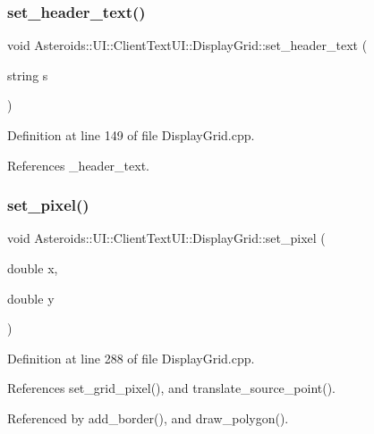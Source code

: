 \subsubsection{\texorpdfstring{set\+\_\+header\+\_\+text()}{set\_header\_text()}}
{\footnotesize\ttfamily void Asteroids\+::\+U\+I\+::\+Client\+Text\+U\+I\+::\+Display\+Grid\+::set\+\_\+header\+\_\+text (\begin{DoxyParamCaption}\item[{string}]{s }\end{DoxyParamCaption})}



Definition at line 149 of file Display\+Grid.\+cpp.



References \+\_\+header\+\_\+text.

\mbox{\label{classAsteroids_1_1UI_1_1ClientTextUI_1_1DisplayGrid_a3f77a0874f78d753020e8ba12081bd85}} 
\subsubsection{\texorpdfstring{set\+\_\+pixel()}{set\_pixel()}}
{\footnotesize\ttfamily void Asteroids\+::\+U\+I\+::\+Client\+Text\+U\+I\+::\+Display\+Grid\+::set\+\_\+pixel (\begin{DoxyParamCaption}\item[{double}]{x,  }\item[{double}]{y }\end{DoxyParamCaption})}



Definition at line 288 of file Display\+Grid.\+cpp.



References set\+\_\+grid\+\_\+pixel(), and translate\+\_\+source\+\_\+point().



Referenced by add\+\_\+border(), and draw\+\_\+polygon().

